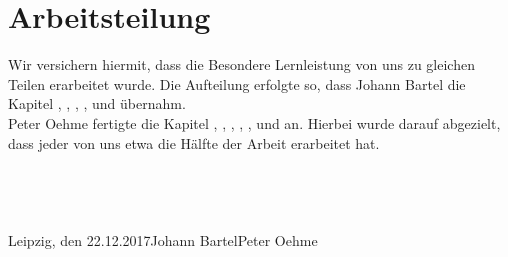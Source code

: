 \chapter*{Arbeitsteilung}
Wir versichern hiermit, dass die Besondere Lernleistung von uns zu gleichen Teilen erarbeitet wurde.
Die Aufteilung erfolgte so, dass Johann Bartel die Kapitel , , , ,  und  übernahm. \\
Peter Oehme fertigte die Kapitel , , , , ,  und  an.
Hierbei wurde darauf abgezielt, dass jeder von uns etwa die Hälfte der Arbeit erarbeitet hat. \\\\\\\\\\
Leipzig, den 22.12.2017\tab Johann Bartel\tab \tab Peter Oehme